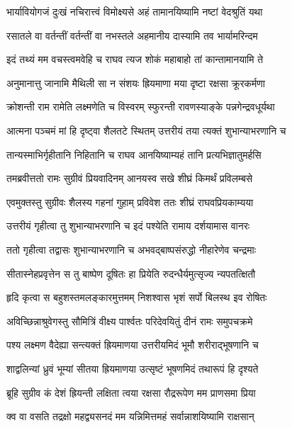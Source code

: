 \twolineshloka
{भार्यावियोगजं दुःखं नचिरात्त्वं विमोक्ष्यसे}
{अहं तामानयिष्यामि नष्टां वेदश्रुतिं यथा} %

\twolineshloka
{रसातले वा वर्तन्तीं वर्तन्तीं वा नभस्तले}
{अहमानीय दास्यामि तव भार्यामरिन्दम} %

\twolineshloka
{इदं तथ्यं मम वचस्त्वमवेहि च राघव}
{त्यज शोकं महाबाहो तां कान्तामानयामि ते} %

\twolineshloka
{अनुमानात्तु जानामि मैथिली सा न संशयः}
{ह्रियमाणा मया दृष्टा रक्षसा क्रूरकर्मणा} %

\twolineshloka
{क्रोशन्ती राम रामेति लक्ष्मणेति च विस्वरम्}
{स्फुरन्ती रावणस्याङ्के पन्नगेन्द्रवधूर्यथा} %

\twolineshloka
{आत्मना पञ्चमं मां हि दृष्ट्वा शैलतटे स्थितम्}
{उत्तरीयं तया त्यक्तं शुभान्याभरणानि च} %

\twolineshloka
{तान्यस्माभिर्गृहीतानि निहितानि च राघव}
{आनयिष्याम्यहं तानि प्रत्यभिज्ञातुमर्हसि} %

\twolineshloka
{तमब्रवीत्ततो रामः सुग्रीवं प्रियवादिनम्}
{आनयस्व सखे शीघ्रं किमर्थं प्रविलम्बसे} %

\twolineshloka
{एवमुक्तस्तु सुग्रीवः शैलस्य गहनां गुहाम्}
{प्रविवेश ततः शीघ्रं राघवप्रियकाम्यया} %

\twolineshloka
{उत्तरीयं गृहीत्वा तु शुभान्याभरणानि च}
{इदं पश्येति रामाय दर्शयामास वानरः} %

\twolineshloka
{ततो गृहीत्वा तद्वासः शुभान्याभरणानि च}
{अभवद्बाष्पसंरुद्धो नीहारेणेव चन्द्रमाः} %

\twolineshloka
{सीतास्नेहप्रवृत्तेन स तु बाष्पेण दूषितः}
{हा प्रियेति रुदन्धैर्यमुत्सृज्य न्यपतत्क्षितौ} %

\twolineshloka
{हृदि कृत्वा स बहुशस्तमलङ्कारमुत्तमम्}
{निशश्वास भृशं सर्पो बिलस्थ इव रोषितः} %

\twolineshloka
{अविच्छिन्नाश्रुवेगस्तु सौमित्रिं वीक्ष्य पार्श्वतः}
{परिदेवयितुं दीनं रामः समुपचक्रमे} %

\twolineshloka
{पश्य लक्ष्मण वैदेह्या सन्त्यक्तं ह्रियमाणया}
{उत्तरीयमिदं भूमौ शरीराद्भूषणानि च} %

\twolineshloka
{शाद्वलिन्यां ध्रुवं भूम्यां सीतया ह्रियमाणया}
{उत्सृष्टं भूषणमिदं तथारूपं हि दृश्यते} %

\twolineshloka
{ब्रूहि सुग्रीव कं देशं ह्रियन्ती लक्षिता त्वया}
{रक्षसा रौद्ररूपेण मम प्राणसमा प्रिया} %

\twolineshloka
{क्व वा वसति तद्रक्षो महद्व्यसनदं मम}
{यन्निमित्तमहं सर्वान्नाशयिष्यामि राक्षसान्} %

